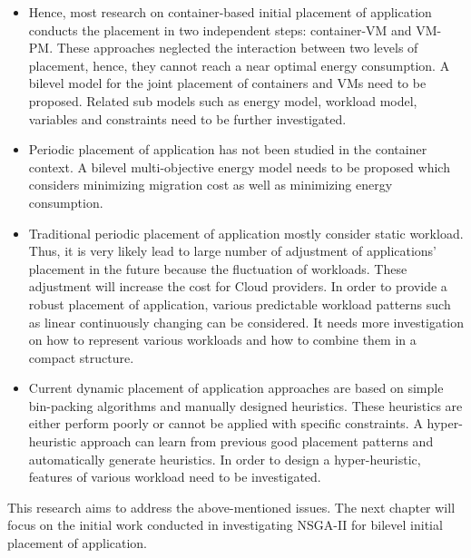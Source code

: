 \begin{itemize}
	\item {} Hence, most research on container-based initial placement of application conducts the placement in two independent steps: container-VM and VM-PM. These approaches neglected the interaction between two levels of placement, hence, they cannot reach a near optimal energy consumption. A bilevel model for the joint placement of containers and VMs need to be proposed. Related sub models such as energy model, workload model, variables and constraints need to be further investigated.
	\item Periodic placement of application has not been studied in the container context. A bilevel multi-objective energy model needs to be proposed which considers minimizing migration cost as well as minimizing energy consumption. 
	\item Traditional periodic placement of application mostly consider static workload. Thus, it is very likely lead to large number of adjustment of applications' placement in the future because the fluctuation of workloads. These adjustment will increase the cost for Cloud providers. In order to provide a robust placement of application, various predictable workload patterns such as linear continuously changing can be considered. It needs more investigation on how to represent various workloads and how to combine them in a compact structure.
	\item Current dynamic placement of application approaches are based on simple bin-packing algorithms and manually designed heuristics. These heuristics are either perform poorly or cannot be applied with specific constraints. A hyper-heuristic approach can learn from previous good placement patterns and automatically generate heuristics. In order to design a hyper-heuristic, features of various workload need to be investigated. 
\end{itemize}


This research aims to address the above-mentioned issues. The next chapter will focus on the initial work conducted in investigating NSGA-II for bilevel initial placement of application.









